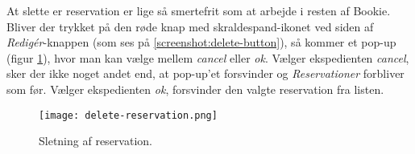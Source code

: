 At slette er reservation er lige så smertefrit som at arbejde i resten af Bookie. Bliver der trykket på den røde knap med skraldespand-ikonet ved siden af \textit{Redigér}-knappen (som ses på \ref{screenshot:delete-button}), så kommer et pop-up (figur \ref{screenshot:delete-reservation}), hvor man kan vælge mellem \textit{cancel} eller \textit{ok}. Vælger ekspedienten \textit{cancel}, sker der ikke noget andet end, at pop-up'et forsvinder og \textit{Reservationer} forbliver som før. Vælger ekspedienten \textit{ok}, forsvinder den valgte reservation fra listen.

\begin{figure} [h]
  \centering
  \texttt{[image: delete-reservation.png]}
  \caption{Sletning af reservation.}
  \label{screenshot:delete-reservation}
\end{figure}